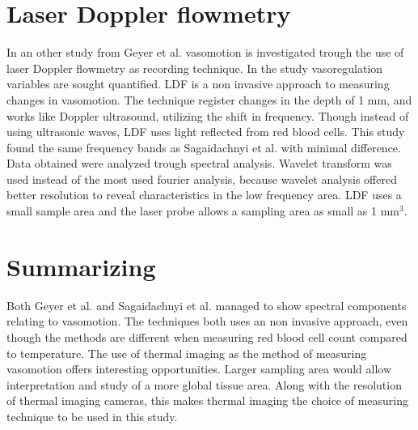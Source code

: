 \section{Laser Doppler flowmetry}
In an other study from Geyer et al. vasomotion is investigated trough the use of laser Doppler flowmetry as recording technique. In the study vasoregulation variables are sought quantified. LDF is a non invasive approach to measuring changes in vasomotion. The technique register changes in the depth of 1 mm, and works like Doppler ultrasound, utilizing the shift in frequency. Though instead of using ultrasonic waves, LDF uses light reflected from red blood cells. This study found the same frequency bands as Sagaidachnyi et al. with minimal difference. Data obtained were analyzed trough spectral analysis. Wavelet transform was used instead of the most used fourier analysis, because wavelet analysis offered better resolution to reveal characteristics in the low frequency area.\cite{geyer2004}
LDF uses a small sample area and the laser probe allows a sampling area as small as 1 mm$^3$.\cite{brothers2010} 


  
\section{Summarizing}

Both Geyer et al. and Sagaidachnyi et al. managed to show spectral components relating to vasomotion. The techniques both uses an non invasive approach, even though the methods are different when measuring red blood cell count compared to temperature. The use of thermal imaging as the method of measuring vasomotion offers interesting opportunities. Larger sampling area would allow interpretation and study of a more global tissue area. Along with the resolution of thermal imaging cameras, this makes thermal imaging the choice of measuring technique to be used in this study. 



